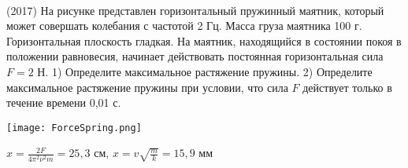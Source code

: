 \begin{ex}
\hspace{0pt} \\
(2017) На рисунке представлен горизонтальный пружинный маятник, который может совершать колебания с частотой 2 Гц. Масса груза маятника 100 г. Горизонтальная плоскость гладкая. На маятник, находящийся в состоянии покоя в положении равновесия, начинает действовать постоянная горизонтальная сила $F = 2$ Н. 1) Определите максимальное растяжение пружины. 2) Определите максимальное растяжение пружины при условии, что сила $F$ действует только в течение времени 0,01 с.
\begin{center}
\texttt{[image: ForceSpring.png]}
\end{center}
\begin{ans}
$x = \frac{2F}{4\pi^2 \nu^2 m} = 25,3$ см, $x = v\sqrt{\frac{m}{k}}=15,9$ мм
\end{ans}
\end{ex}
